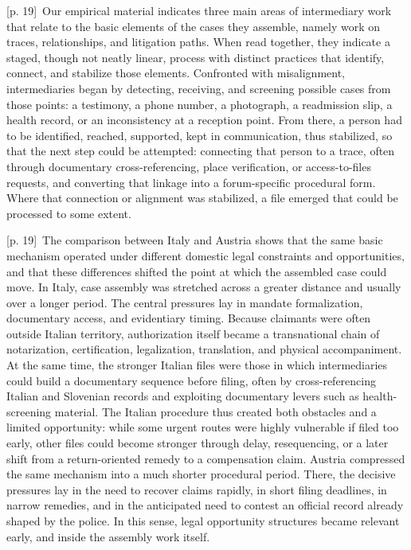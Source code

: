\documentclass[10pt,a4paper]{article}
\begin{document}
{\scriptsize\color{gray} [p. 19]}\ Our empirical material indicates three main areas of intermediary work that relate to the basic elements of the cases they assemble, namely work on traces, relationships, and litigation paths. When read together, they indicate a staged, though not neatly linear, process with distinct practices that identify, connect, and stabilize those elements. Confronted with misalignment, intermediaries began by detecting, receiving, and screening possible cases from those points: a testimony, a phone number, a photograph, a readmission slip, a health record, or an inconsistency at a reception point. From there, a person had to be identified, reached, supported, kept in communication, thus stabilized, so that the next step could be attempted: connecting that person to a trace, often through documentary cross-referencing, place verification, or access-to-files requests, and converting that linkage into a forum-specific procedural form. Where that connection or alignment was stabilized, a file emerged that could be processed to some extent.\par
{\scriptsize\color{gray} [p. 19]}\ The comparison between Italy and Austria shows that the same basic mechanism operated under different domestic legal constraints and opportunities, and that these differences shifted the point at which the assembled case could move. In Italy, case assembly was stretched across a greater distance and usually over a longer period. The central pressures lay in mandate formalization, documentary access, and evidentiary timing. Because claimants were often outside Italian territory, authorization itself became a transnational chain of notarization, certification, legalization, translation, and physical accompaniment. At the same time, the stronger Italian files were those in which intermediaries could build a documentary sequence before filing, often by cross-referencing Italian and Slovenian records and exploiting documentary levers such as health-screening material. The Italian procedure thus created both obstacles and a limited opportunity: while some urgent routes were highly vulnerable if filed too early, other files could become stronger through delay, resequencing, or a later shift from a return-oriented remedy to a compensation claim. Austria compressed the same mechanism into a much shorter procedural period. There, the decisive pressures lay in the need to recover claims rapidly, in short filing deadlines, in narrow remedies, and in the anticipated need to contest an official record already shaped by the police. In this sense, legal opportunity structures became relevant early, and inside the assembly work itself.\par
\end{document}
